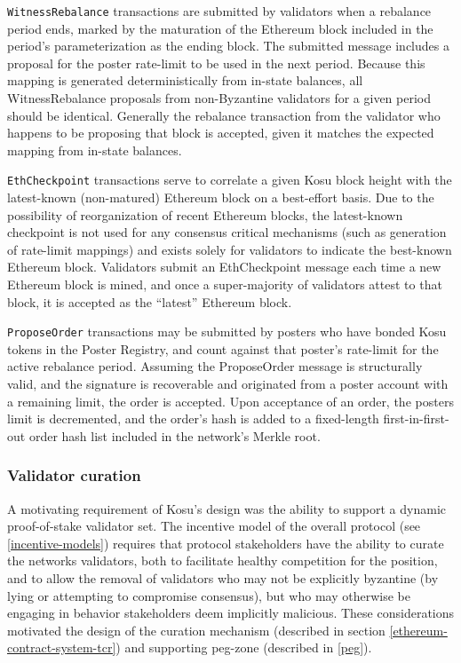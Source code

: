 \documentclass[10pt]{article}
\begin{document}
\texttt{WitnessRebalance} transactions are submitted by validators when a rebalance period ends, marked by the maturation of the Ethereum block included in the period’s parameterization as the ending block. The submitted message includes a proposal for the poster rate-limit to be used in the next period. Because this mapping is generated deterministically from in-state balances, all WitnessRebalance proposals from non-Byzantine validators for a given period should be identical. Generally the rebalance transaction from the validator who happens to be proposing that block is accepted, given it matches the expected mapping from in-state balances. 
\medskip

\texttt{EthCheckpoint} transactions serve to correlate a given Kosu block height with the latest-known (non-matured) Ethereum block on a best-effort basis. Due to the possibility of reorganization of recent Ethereum blocks, the latest-known checkpoint is not used for any consensus critical mechanisms (such as generation of rate-limit mappings) and exists solely for validators to indicate the best-known Ethereum block. Validators submit an EthCheckpoint message each time a new Ethereum block is mined, and once a super-majority of validators attest to that block, it is accepted as the ``latest'' Ethereum block. 
\medskip

\texttt{ProposeOrder} transactions may be submitted by posters who have bonded Kosu tokens in the Poster Registry, and count against that poster’s rate-limit for the active rebalance period. Assuming the ProposeOrder message is structurally valid, and the signature is recoverable and originated from a poster account with a remaining limit, the order is accepted. Upon acceptance of an order, the posters limit is decremented, and the order’s hash is added to a fixed-length first-in-first-out order hash list included in the network’s Merkle root.
\subsubsection{Validator curation}\label{tm-network-validators}
A motivating requirement of Kosu’s design was the ability to support a dynamic proof-of-stake validator set. The incentive model of the overall protocol (see \ref{incentive-models}) requires that protocol stakeholders have the ability to curate the networks validators, both to facilitate healthy competition for the position, and to allow the removal of validators who may not be explicitly byzantine (by lying or attempting to compromise consensus), but who may otherwise be engaging in behavior stakeholders deem implicitly malicious. These considerations motivated the design of the curation mechanism (described in section \ref{ethereum-contract-system-tcr}) and supporting peg-zone (described in \ref{peg}).
\medskip
\end{document}
